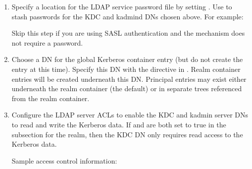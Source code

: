 \documentclass[letterpaper,10pt,english]{sphinxmanual}
\begin{document}
\begin{enumerate}
\item {} 
\sphinxAtStartPar
Specify a location for the LDAP service password file by setting
.  Use 
to stash passwords for the KDC and kadmind DNs chosen above.  For
example:

\begin{sphinxVerbatim}[commandchars=\\\{\}]
    
\end{sphinxVerbatim}

\sphinxAtStartPar
Skip this step if you are using SASL authentication and the
mechanism does not require a password.

\item {} 
\sphinxAtStartPar
Choose a DN for the global Kerberos container entry (but do not
create the entry at this time).  Specify this DN with the
 directive in {\hyperref[\detokenize{admin/conf_files/kdc_conf:kdc-conf-5}]{}}.
Realm container entries will be created underneath this DN.
Principal entries may exist either underneath the realm container
(the default) or in separate trees referenced from the realm
container.

\item {} 
\sphinxAtStartPar
Configure the LDAP server ACLs to enable the KDC and kadmin server
DNs to read and write the Kerberos data.  If
 and  are both set to
true in the {\hyperref[\detokenize{admin/conf_files/kdc_conf:dbmodules}]{}} subsection for the realm, then the
KDC DN only requires read access to the Kerberos data.

\sphinxAtStartPar
Sample access control information:

\begin{sphinxVerbatim}[commandchars=\\\{\}]
  
      


\end{sphinxVerbatim}
\end{enumerate}
\end{document}
